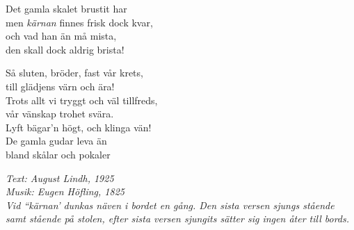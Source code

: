 Det gamla skalet brustit har\\
men \textit{kärnan} finnes frisk dock kvar,\\
och vad han än må mista,\\
den skall dock aldrig brista!\par
\vspace{10pt}
Så sluten, bröder, fast vår krets,\\
till glädjens värn och ära!\\
Trots allt vi tryggt och väl tillfreds,\\
vår vänskap trohet svära.\\
Lyft bägar'n högt, och klinga vän!\\
De gamla gudar leva än\\
\revrpt bland skålar och pokaler\rpt\par
\vspace{10pt}
{\footnotesize\textit{Text: August Lindh, 1925\\ Musik:
Eugen Höfling, 1825\\
Vid ``kärnan' dunkas näven i bordet en
gång. Den sista versen sjungs stående samt stående på stolen, efter
sista versen sjungits sätter sig ingen åter till bords.}}
